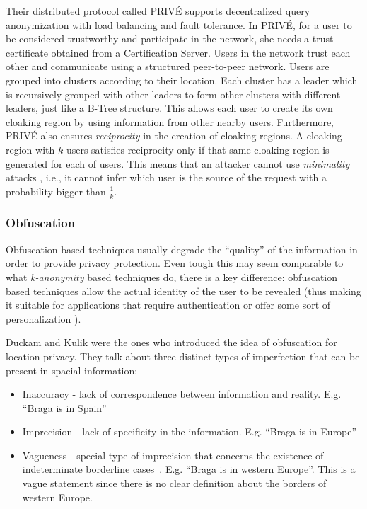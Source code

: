 Their distributed protocol called PRIVÉ supports decentralized query
anonymization with load balancing and fault tolerance. In PRIVÉ, for a
user to be considered trustworthy and participate in the network, she
needs a trust certificate obtained from a Certification Server. Users
in the network trust each other and communicate using a structured
peer-to-peer network. Users are grouped into clusters according to
their location. Each cluster has a leader which is recursively grouped
with other leaders to form other clusters with different leaders, just
like a B-Tree structure. This allows each user to create its own
cloaking region by using information from other nearby users.
Furthermore, PRIVÉ also ensures \emph{reciprocity} in the creation of
cloaking regions. A cloaking region with $k$ users satisfies
reciprocity only if that same cloaking region is generated for each of
users. This means that an attacker cannot use \emph{minimality} attacks
\cite{wong2007minimality}, i.e., it cannot infer which user is the
source of the request with a probability bigger than $\frac{1}{k}$.

\subsubsection{Obfuscation}
\label{sec:Obfuscation}

Obfuscation based techniques usually degrade the ``quality'' of the
information in order to provide privacy protection. Even tough this may
seem comparable to what \emph{k-anonymity} based techniques do, there is a
key difference: obfuscation based techniques allow the actual identity
of the user to be revealed (thus making it suitable for applications
that require authentication or offer some sort of personalization
\cite{langheinrich2001privacy}).

Duckam and Kulik
\cite{duckham2005formal} were the ones who introduced the idea of
obfuscation for location privacy. They talk about three distinct types of
imperfection that can be present in spacial information:
\begin{itemize}
\item Inaccuracy - lack of correspondence between information and
  reality. E.g. ``Braga is in Spain''
\item Imprecision - lack of specificity in the information. E.g.
  ``Braga is in Europe''
\item Vagueness - special type of imprecision that concerns the
  existence of indeterminate borderline
  cases~\cite{duckham2001formal}. E.g. ``Braga is in western Europe''.
  This is a vague statement since there is no clear definition about
  the borders of western Europe.
\end{itemize}

